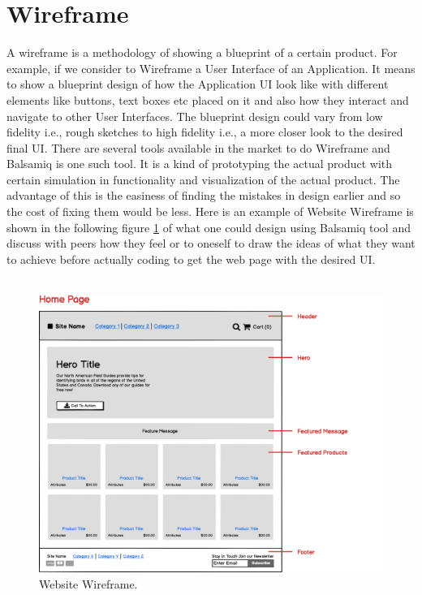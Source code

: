 \section{Wireframe}

A wireframe is a methodology of showing a blueprint of a certain product. For example, if we consider to Wireframe a User Interface of an Application. It means to show a blueprint design of how the Application UI look like with different elements like buttons, text boxes etc placed on it and also how they interact and navigate to other User Interfaces. The blueprint design could vary from low fidelity i.e., rough sketches to high fidelity i.e., a more closer look to the desired final UI. There are several tools available in the market to do Wireframe and Balsamiq \cite{B} is one such tool. It is a kind of prototyping the actual product with certain simulation in functionality and visualization of the actual product. The advantage of this is the easiness of finding the mistakes in design earlier and so the cost of fixing them would be less. Here is an example of Website Wireframe is shown in the following figure \ref{fig:wireframe_website} of what one could design using Balsamiq tool and discuss with peers how they feel or to oneself to draw the ideas of what they want to achieve before actually coding to get the web page with the desired UI. \\ \\

\begin{figure}[hbt!]
	\centering
	\includegraphics[width=\linewidth]{figures/wireframe_website}
	\caption{Website Wireframe.}
	\label{fig:wireframe_website}
\end{figure}

